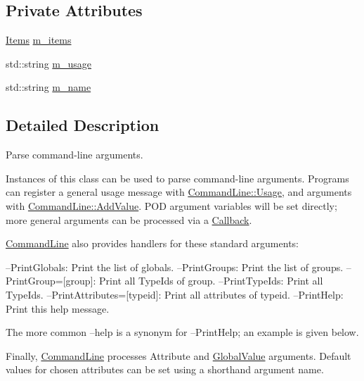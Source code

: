 \subsection*{Private Attributes}
\begin{DoxyCompactItemize}
\item 
\hyperlink{classns3_1_1CommandLine_a1150dc31fbfd2fb9d622be08ff15f6ad}{Items} \hyperlink{classns3_1_1CommandLine_afe80ed73850cbfc83090bea2561df8be}{m\+\_\+items}
\item 
std\+::string \hyperlink{classns3_1_1CommandLine_abf0e44700f8a5195206c692f38c7dcc6}{m\+\_\+usage}
\item 
std\+::string \hyperlink{classns3_1_1CommandLine_ab9d0d51a6dd793ae6488b6861c2655c1}{m\+\_\+name}
\end{DoxyCompactItemize}


\subsection{Detailed Description}
Parse command-\/line arguments. 

Instances of this class can be used to parse command-\/line arguments. Programs can register a general usage message with \hyperlink{classns3_1_1CommandLine_a9db9facadd99f6dfe78e39e22d5db3c0}{Command\+Line\+::\+Usage}, and arguments with \hyperlink{classns3_1_1CommandLine_addcfb546c7ad4c8bd0965654d55beb8e}{Command\+Line\+::\+Add\+Value}. P\+OD argument variables will be set directly; more general arguments can be processed via a \hyperlink{classns3_1_1Callback}{Callback}.

\hyperlink{classns3_1_1CommandLine}{Command\+Line} also provides handlers for these standard arguments\+: \begin{DoxyVerb}--PrintGlobals:              Print the list of globals.
--PrintGroups:               Print the list of groups.
--PrintGroup=[group]:        Print all TypeIds of group.
--PrintTypeIds:              Print all TypeIds.
--PrintAttributes=[typeid]:  Print all attributes of typeid.
--PrintHelp:                 Print this help message. \end{DoxyVerb}


The more common {\ttfamily --help} is a synonym for {\ttfamily --Print\+Help}; an example is given below.

Finally, \hyperlink{classns3_1_1CommandLine}{Command\+Line} processes Attribute and \hyperlink{classns3_1_1GlobalValue}{Global\+Value} arguments. Default values for chosen attributes can be set using a shorthand argument name.

